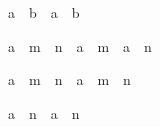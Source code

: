 \begin{isabellebody}
\begin{isamarkuptext}
\begin{isabelle}%
{\isasymbar}a\ {\isacharplus}\ b{\isasymbar}\ {\isasymle}\ {\isasymbar}a{\isasymbar}\ {\isacharplus}\ {\isasymbar}b{\isasymbar}%
\end{isabelle}

\begin{isabelle}%
a\ {\isacharcircum}\ {\isacharparenleft}m\ {\isacharplus}\ n{\isacharparenright}\ {\isacharequal}\ a\ {\isacharcircum}\ m\ {\isacharasterisk}\ a\ {\isacharcircum}\ n%
\end{isabelle}

\begin{isabelle}%
a\ {\isacharcircum}\ {\isacharparenleft}m\ {\isacharasterisk}\ n{\isacharparenright}\ {\isacharequal}\ {\isacharparenleft}a\ {\isacharcircum}\ m{\isacharparenright}\ {\isacharcircum}\ n%
\end{isabelle}

\begin{isabelle}%
{\isasymbar}a\ {\isacharcircum}\ n{\isasymbar}\ {\isacharequal}\ {\isasymbar}a{\isasymbar}\ {\isacharcircum}\ n%
\end{isabelle}
%
\end{isamarkuptext}%
\isamarkuptrue%
%
\isadelimtheory
%
\endisadelimtheory
%
\isatagtheory
{}\isamarkupfalse%
%
\endisatagtheory
{\isafoldtheory}%
%
\isadelimtheory
%
\endisadelimtheory
\isanewline
\end{isabellebody}%
